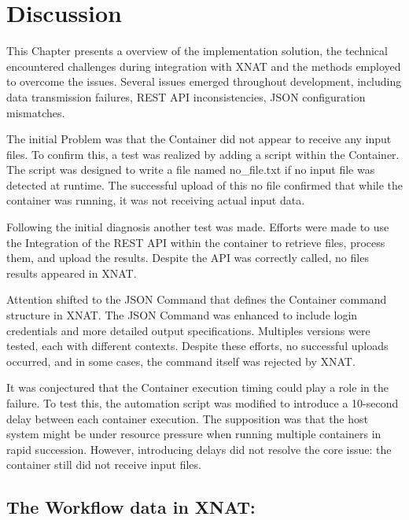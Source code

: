 
\chapter{Discussion}
This Chapter presents a overview of the implementation solution, the technical encountered challenges during integration with XNAT and the methods employed to overcome the issues. Several issues emerged throughout development, including data transmission failures, REST API inconsistencies, JSON configuration mismatches.

The initial Problem was that the Container did not appear to receive any input files. To confirm this, a test was realized by adding a script within the Container. The script was designed to write a file named no\_file.txt if no input file was detected at runtime. The successful upload of this no file confirmed that while the container was running, it was not receiving actual input data.

Following the initial diagnosis another test was made. Efforts were made to use the Integration of the REST API within the container to retrieve files, process them, and upload the results.
Despite the API was correctly called, no files results appeared in XNAT. 

Attention shifted to the JSON Command that defines the Container command structure in XNAT. The JSON Command was enhanced to include login credentials and more detailed output specifications. Multiples versions were tested, each with different contexts. Despite these efforts, no successful uploads occurred, and in some cases, the command itself was rejected by XNAT. 

It was conjectured that the Container execution timing could play a role in the failure. To test this, the automation script was modified to introduce a 10-second delay between each container execution. The supposition was that the host system might be under resource pressure when running multiple containers in rapid succession. However, introducing delays did not resolve the core issue: the container still did not receive input files.

\section{The Workflow data in XNAT:}

